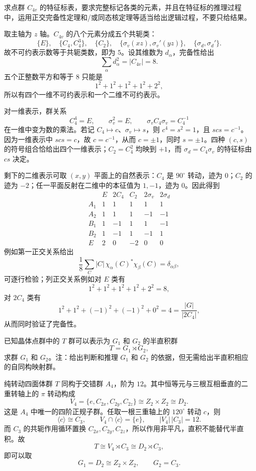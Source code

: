 \begin{question}[20 分]
求点群 $C_{4v}$ 的特征标表，要求完整标记各类的元素，并且在特征标的推理过程中，运用正交完备性定理和/或同态核定理等适当给出逻辑过程，不要只给结果。
\begin{solution}
取主轴为 $z$ 轴。$C_{4v}$ 的八个元素分成五个共轭类：
\[
\{E\},\quad \{C_4,C_4^3\},\quad \{C_2\},\quad
\{\sigma_v(xz),\sigma_v'(yz)\},\quad
\{\sigma_d,\sigma_d'\}.
\]
故不可约表示数等于共轭类数，即为 $5$。设其维数为 $d_\alpha$，完备性给出
\[
\sum_\alpha d_\alpha^2=|C_{4v}|=8.
\]
五个正整数平方和等于 $8$ 只能是
\[
1^2+1^2+1^2+1^2+2^2,
\]
所以有四个一维不可约表示和一个二维不可约表示。

对一维表示，群关系
\[
C_4^4=E,\qquad \sigma_v^2=E,\qquad
\sigma_v C_4\sigma_v=C_4^{-1}
\]
在一维中变为数的乘法。若记 $C_4\mapsto c$、$\sigma_v\mapsto s$，则
$c^4=s^2=1$，且 $scs=c^{-1}$。因为一维表示中 $scs=c$，故 $c=c^{-1}$，从而 $c=\pm1$，同时 $s=\pm1$。四种 $(c,s)$ 的符号组合恰给出四个一维表示；$C_2=C_4^2$ 均映到 $+1$，而 $\sigma_d=C_4\sigma_v$ 的特征标由 $cs$ 决定。

剩下的二维表示可取 $(x,y)$ 平面上的自然表示：$C_4$ 是 $90^\circ$ 转动，迹为 $0$；$C_2$ 的迹为 $-2$；任一平面反射在二维中的本征值为 $1,-1$，迹为 $0$。因此得到
\[
\begin{array}{c|ccccc}
 & E & 2C_4 & C_2 & 2\sigma_v & 2\sigma_d\\\hline
A_1&1&1&1&1&1\\
A_2&1&1&1&-1&-1\\
B_1&1&-1&1&1&-1\\
B_2&1&-1&1&-1&1\\
E&2&0&-2&0&0
\end{array}
\]
例如第一正交关系给出
\[
\frac1{8}\sum_C |C|\,\chi_\alpha(C)^*\chi_\beta(C)=\delta_{\alpha\beta},
\]
可逐行检验；列正交关系例如对 $E$ 类有
\[
1^2+1^2+1^2+1^2+2^2=8,
\]
对 $2C_4$ 类有
\[
1^2+1^2+(-1)^2+(-1)^2+0^2=4=\frac{|G|}{|2C_4|},
\]
从而同时验证了完备性。
\end{solution}
\end{question}

\begin{question}[15 分]
已知晶体点群中的 $T$ 群可以表示为 $G_1$ 和 $G_2$ 的半直积群
\[
T=G_1\rtimes G_2,
\]
求群 $G_1$ 和 $G_2$。注：给出判断和推理 $G_1$ 和 $G_2$ 的依据，但无需给出半直积相应的自同构映射群。
\begin{solution}
纯转动四面体群 $T$ 同构于交错群 $A_4$，阶为 $12$。其中恒等元与三根互相垂直的二重转轴上的 $\pi$ 转动构成
\[
V_4=\{e,C_{2x},C_{2y},C_{2z}\}\cong Z_2\times Z_2\cong D_2.
\]
这是 $A_4$ 中唯一的四阶正规子群。任取一根三重轴上的 $120^\circ$ 转动 $c$，则
\[
\langle c\rangle\cong C_3,
\qquad V_4\cap\langle c\rangle=\{e\},
\qquad |V_4|\,|C_3|=12.
\]
而 $C_3$ 的共轭作用循环置换 $C_{2x},C_{2y},C_{2z}$，所以作用非平凡，直积不能替代半直积。故
\[
\boxed{T\cong V_4\rtimes C_3\cong D_2\rtimes C_3},
\]
即可以取
\[
\boxed{G_1=D_2\cong Z_2\times Z_2,\qquad G_2=C_3}.
\]
\end{solution}
\end{question}
